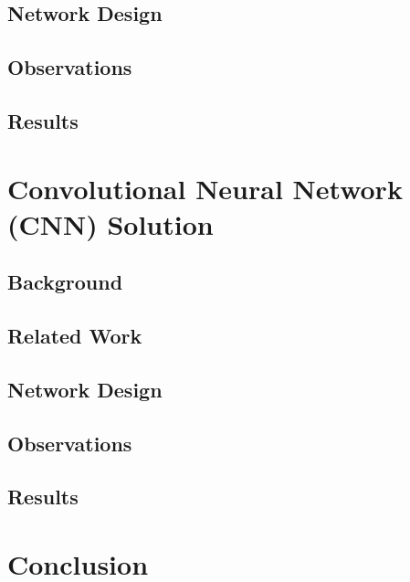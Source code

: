 \documentclass[12pt,journal,onecolumn,twoside]{IEEEtran}
\begin{document}
\subsection{Network Design}

\subsection{Observations}

\subsection{Results}

\section{Convolutional Neural Network (CNN) Solution}

\subsection{Background}

\subsection{Related Work}

\subsection{Network Design}

\subsection{Observations}

\subsection{Results}

\section{Conclusion}


\ifCLASSOPTIONcaptionsoff
  \newpage
\fi
\end{document}

